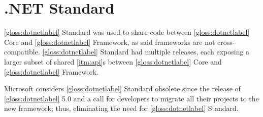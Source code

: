 \section{.NET Standard}
\ref{gloss:dotnetlabel} Standard was used to share code between \ref{gloss:dotnetlabel} Core and \ref{gloss:dotnetlabel} Framework, as said frameworks are not cross-compatible. \ref{gloss:dotnetlabel} Standard had multiple releases, each exposing a larger subset of shared \ref{itm:api}s between \ref{gloss:dotnetlabel} Core and \ref{gloss:dotnetlabel} Framework.

Microsoft considers \ref{gloss:dotnetlabel} Standard obsolete since the release of \ref{gloss:dotnetlabel} 5.0 and a call for developers to migrate all their projects to the new framework; thus, eliminating the need for \ref{gloss:dotnetlabel} Standard.